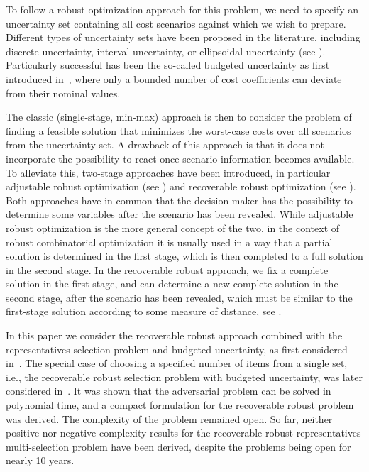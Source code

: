To follow a robust optimization approach for this problem, we need to specify an uncertainty set containing all cost scenarios against which we wish to prepare. Different types of uncertainty sets have been proposed in the literature, including discrete uncertainty, interval uncertainty, or ellipsoidal uncertainty (see \cite{goerigk2016algorithm}). Particularly successful has been the so-called budgeted uncertainty as first introduced in~\cite{bertsimas2003robust}, where only a bounded number of cost coefficients can deviate from their nominal values. 

The classic (single-stage, min-max) approach is then to consider the problem of finding a feasible solution that minimizes the worst-case costs over all scenarios from the uncertainty set.
A drawback of this approach is that it does not incorporate the possibility to react once scenario information becomes available. To alleviate this, two-stage approaches have been introduced, in particular adjustable robust optimization (see \cite{yanikouglu2019survey}) and recoverable robust optimization (see \cite{liebchen2009concept}). Both approaches have in common that the decision maker has the possibility to determine some variables after the scenario has been revealed. While adjustable robust optimization is the more general concept of the two, in the context of robust combinatorial optimization it is usually used in a way that a partial solution is determined in the first stage, which is then completed to a full solution in the second stage. In the recoverable robust approach, we fix a complete solution in the first stage, and can determine a new complete solution in the second stage, after the scenario has been revealed, which must be similar to the first-stage solution according to some measure of distance, see \cite{kasperski2016robust}.

In this paper we consider the
recoverable robust approach combined with the representatives selection problem and budgeted uncertainty, as first considered in~\cite{busing2011phd}. The special case of choosing a specified number of items from a single set, i.e., the recoverable robust selection problem with budgeted uncertainty, was later considered in~\cite{chassein2018recoverable}. It was shown that the adversarial problem can be solved in polynomial time, and a compact formulation for the recoverable robust problem was derived. The complexity of the problem remained open. So far, neither positive nor negative complexity results for the recoverable robust representatives multi-selection problem have been derived, despite the problems being open for nearly 10 years.


